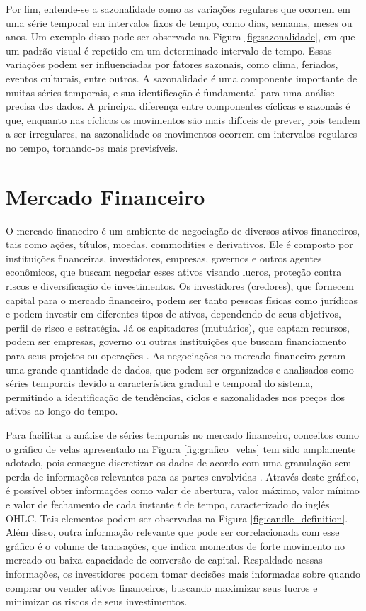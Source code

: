 Por fim, entende-se a sazonalidade como as variações regulares que ocorrem em uma série temporal em intervalos fixos de tempo, como dias, semanas, meses ou anos. Um exemplo disso pode ser observado na Figura \ref{fig:sazonalidade}, em que um padrão visual é repetido em um determinado intervalo de tempo. Essas variações podem ser influenciadas por fatores sazonais, como clima, feriados, eventos culturais, entre outros. A sazonalidade é uma componente importante de muitas séries temporais, e sua identificação é fundamental para uma análise precisa dos dados. A principal diferença entre componentes cíclicas e sazonais é que, enquanto nas cíclicas os movimentos são mais difíceis de prever, pois tendem a ser irregulares, na sazonalidade os movimentos ocorrem em intervalos regulares no tempo, tornando-os mais previsíveis. 

\section{Mercado Financeiro}
\label{subsec:mercado_financeiro}
O mercado financeiro é um ambiente de negociação de diversos ativos financeiros, tais como ações, títulos, moedas, commodities e derivativos. Ele é composto por instituições financeiras, investidores, empresas, governos e outros agentes econômicos, que buscam negociar esses ativos visando lucros, proteção contra riscos e diversificação de investimentos. Os investidores (credores), que fornecem capital para o mercado financeiro, podem ser tanto pessoas físicas como jurídicas e podem investir em diferentes tipos de ativos, dependendo de seus objetivos, perfil de risco e estratégia. Já os capitadores (mutuários), que captam recursos, podem ser empresas, governo ou outras instituições que buscam financiamento para seus projetos ou operações \cite{mercado}. As negociações no mercado financeiro geram uma grande quantidade de dados, que podem ser organizados e analisados como séries temporais devido a característica gradual e temporal do sistema, permitindo a identificação de tendências, ciclos e sazonalidades nos preços dos ativos ao longo do tempo. 

Para facilitar a análise de séries temporais no mercado financeiro, conceitos como o gráfico de velas apresentado na Figura \ref{fig:grafico_velas} tem sido amplamente adotado, pois consegue discretizar os dados de acordo com uma granulação sem perda de informações relevantes para as partes envolvidas \cite{bulkowski2012encyclopedia}. Através deste gráfico, é possível obter informações como valor de abertura, valor máximo, valor mínimo e valor de fechamento de cada instante $t$ de tempo, caracterizado do inglês \ac{OHLC}. Tais elementos podem ser observadas na Figura \ref{fig:candle_definition}. Além disso, outra informação relevante que pode ser correlacionada com esse gráfico é o volume de transações, que indica momentos de forte movimento no mercado ou baixa capacidade de conversão de capital. Respaldado nessas informações, os investidores podem tomar decisões mais informadas sobre quando comprar ou vender ativos financeiros, buscando maximizar seus lucros e minimizar os riscos de seus investimentos.

